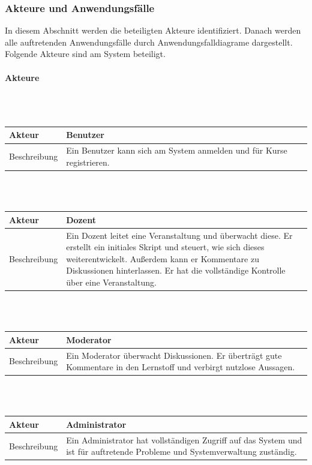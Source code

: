 \documentclass[12pt,a4paper]{article}
\begin{document}
\subsubsection*{Akteure und Anwendungsfälle}
In diesem Abschnitt werden die beteiligten Akteure identifiziert. Danach werden alle auftretenden Anwendungsfälle durch Anwendungsfalldiagrame dargestellt.
Folgende Akteure sind am System beteiligt.\\
\paragraph{Akteure}
\mbox{}\\\\
\begin{tabular}{l p{12cm}}
Akteur & \textbf{Benutzer} \\ 
\hline Beschreibung & Ein Benutzer kann sich am System anmelden und für Kurse registrieren. \\ 
\end{tabular}\\\\

\begin{tabular}{l p{12cm}}
Akteur & \textbf{Dozent} \\ 
\hline 
Beschreibung 	& Ein Dozent leitet eine Veranstaltung und überwacht diese. Er erstellt ein initiales Skript und steuert, wie sich dieses weiterentwickelt. Außerdem kann er Kommentare zu Diskussionen hinterlassen. Er hat die vollständige Kontrolle über eine Veranstaltung.\\ 
\end{tabular}\\\\

\begin{tabular}{l p{12cm}}
Akteur & \textbf{Moderator} \\ 
\hline Beschreibung & Ein Moderator überwacht Diskussionen. Er überträgt gute Kommentare in den Lernstoff und verbirgt nutzlose Aussagen.\\ 
\end{tabular}\\\\

\begin{tabular}{l p{12cm}}
Akteur & \textbf{Administrator} \\ 
\hline Beschreibung & Ein Administrator hat vollständigen Zugriff auf das System und ist für auftretende Probleme und Systemverwaltung zuständig. \\ 
\end{tabular}\\\\
\end{document}
